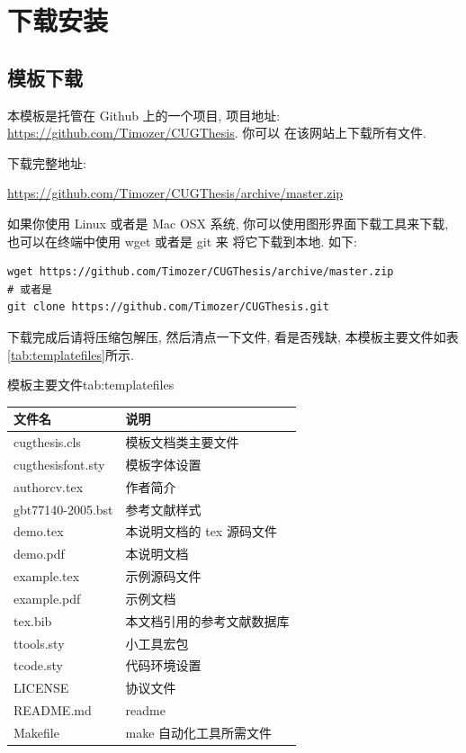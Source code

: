 \documentclass[bibsec, doctor]{cugthesis}
\begin{document}
\section{下载安装}
\label{sec:xia_zai_an_zhuang_}

\subsection{模板下载}
\label{sub:mo_ban_xia_zai_}
本模板是托管在 Github 上的一个项目, 项目地址: \url{https://github.com/Timozer/CUGThesis}. 你可以
在该网站上下载所有文件.

下载完整地址:

\url{https://github.com/Timozer/CUGThesis/archive/master.zip}

如果你使用 Linux 或者是 Mac OSX 系统, 你可以使用图形界面下载工具来下载, 也可以在终端中使用 wget 或者是 git 来
将它下载到本地. 如下:

\begin{verbatim}
wget https://github.com/Timozer/CUGThesis/archive/master.zip
# 或者是
git clone https://github.com/Timozer/CUGThesis.git 
\end{verbatim}

下载完成后请将压缩包解压, 然后清点一下文件, 看是否残缺, 本模板主要文件如表\ref{tab:templatefiles}所示.
\begin{ttab}{模板主要文件}{tab:templatefiles}
    \begin{tabular}{ll}
        \toprule
        文件名            & 说明                       \\
        \midrule
        cugthesis.cls     & 模板文档类主要文件         \\
        cugthesisfont.sty & 模板字体设置               \\
        authorcv.tex      & 作者简介                   \\
        gbt77140-2005.bst & 参考文献样式               \\
        demo.tex          & 本说明文档的 tex 源码文件  \\
        demo.pdf          & 本说明文档                 \\
        example.tex       & 示例源码文件               \\
        example.pdf       & 示例文档                   \\
        tex.bib           & 本文档引用的参考文献数据库 \\
        ttools.sty        & 小工具宏包                 \\
        tcode.sty         & 代码环境设置               \\
        LICENSE           & 协议文件                   \\
        README.md         & readme                     \\
        Makefile          & make 自动化工具所需文件    \\
        \bottomrule 
    \end{tabular}
\end{ttab}
\end{document}
